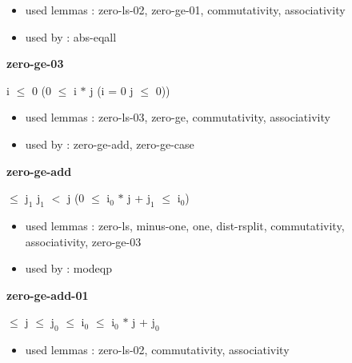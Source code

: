 \documentclass[a4paper]{article}
\begin{document}
\begin{itemize}


\item       used lemmas  : zero-ls-02, zero-ge-01, commutativity, associativity
\item       used by      : abs-eqall

\end{itemize}

\medskip

\bigskip

{\large\bf zero-ge-03}

\medskip

 \Fol i $\le$ 0 \Imp (0 $\le$ i $*$ j \Equiv \Not \Not (i = 0 \Or j $\le$ 0))

\begin{itemize}


\item       used lemmas  : zero-ls-03, zero-ge, commutativity, associativity
\item       used by      : zero-ge-add, zero-ge-case

\end{itemize}

\medskip

\bigskip

{\large\bf zero-ge-add}

\medskip

  $\le$ $\mbox{j}_{1}$ \And $\mbox{j}_{1}$ $<$ j \Imp (0 $\le$ $\mbox{i}_{0}$ $*$ j + $\mbox{j}_{1}$  $\le$ $\mbox{i}_{0}$)

\begin{itemize}


\item       used lemmas  : zero-ls, minus-one, one, dist-rsplit, commutativity, associativity, zero-ge-03
\item       used by      : modeqp

\end{itemize}

\medskip

\bigskip

{\large\bf zero-ge-add-01}

\medskip

  $\le$ j  $\le$ $\mbox{j}_{0}$  $\le$ $\mbox{i}_{0}$  $\le$ $\mbox{i}_{0}$ $*$ j + $\mbox{j}_{0}$

\begin{itemize}


\item       used lemmas  : zero-ls-02, commutativity, associativity

\end{itemize}
\end{document}

